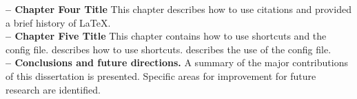 \noindent \textbf{\chapterfourname{} -- Chapter Four Title}
This chapter describes how to use citations and provided a brief 
history of \LaTeX. \\

\noindent \textbf{\chapterfivename{} -- Chapter Five Title}
This chapter contains how to use shortcuts and the config file.
 describes how to use 
shortcuts.  describes 
the use of the config file. \\


\noindent \textbf{\conc{} -- Conclusions and future directions.}
A summary of the major contributions of this dissertation is presented. Specific
areas for improvement for future research are identified. 












